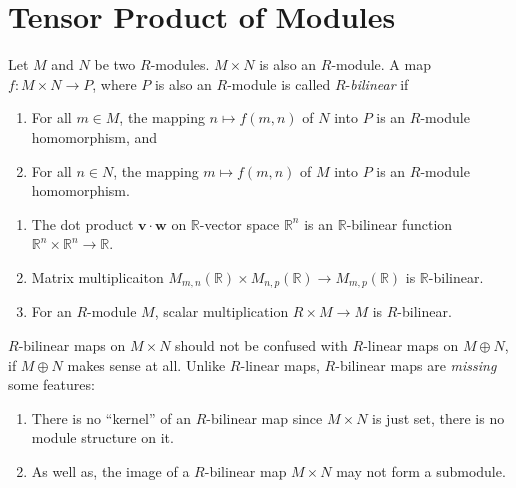 \section{Tensor Product of Modules}
\begin{definition}
    Let \( M \) and  \( N \) be two  \( R \)-modules.  \( M \times N \) is also an  \( R \)-module. A map  \( f: M \times N \to P \), where  \( P \) is also an  \( R \)-module is called  \( R \)-\textit{bilinear} if
    \begin{enumerate}
        \item For all \( m \in M \), the mapping \( n \mapsto f(m, n) \) of  \( N \) into  \( P \) is an  \( R \)-module homomorphism, and 
        \item For all  \( n \in N \), the mapping  \( m \mapsto f(m, n) \) of  \( M \) into  \( P \) is an  \( R \)-module homomorphism.
    \end{enumerate}
\end{definition}
\begin{example}
    \begin{enumerate}
        \item The dot product \( \mathbf{v} \cdot \mathbf{w} \) on  \( \mathbb{R} \)-vector space \( \mathbb{R}^n \) is an \( \mathbb{R} \)-bilinear function \( \mathbb{R}^n \times \mathbb{R}^n \to \mathbb{R} \).
        \item Matrix multiplicaiton \( M_{m,n}(\mathbb{R}) \times M_{n, p}(\mathbb{R}) \to M_{m, p}(\mathbb{R})\) is \( \mathbb{R} \)-bilinear.
        \item For an \( R \)-module  \( M \), scalar multiplication  \( R \times M \to M \) is  \( R \)-bilinear.
    \end{enumerate}
\end{example}
\begin{remark}
    \( R \)-bilinear maps on  \( M \times N \) should not be confused with  \( R \)-linear maps on  \( M \oplus N \), if \( M \oplus N \) makes sense at all. Unlike  \( R \)-linear maps,  \( R \)-bilinear maps are \textit{missing} some features:
\begin{enumerate}
    \item There is no ``kernel'' of an \( R \)-bilinear map since \( M \times N \) is just set, there is no module structure on it.
    \item As well as, the image of a  \( R \)-bilinear map  \( M \times N \) may not form a submodule.
\end{enumerate}
\end{remark}
